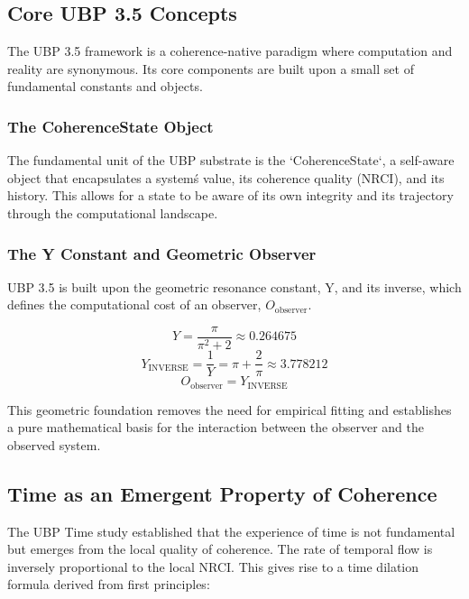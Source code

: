 \documentclass[12pt, a4paper]{article}
\begin{document}
\subsection{Core UBP 3.5 Concepts}
The UBP 3.5 framework is a coherence-native paradigm where computation and reality are synonymous. Its core components are built upon a small set of fundamental constants and objects.

\subsubsection{The CoherenceState Object}
The fundamental unit of the UBP substrate is the `CoherenceState`, a self-aware object that encapsulates a system\'s value, its coherence quality (NRCI), and its history. This allows for a state to be aware of its own integrity and its trajectory through the computational landscape.

\subsubsection{The Y Constant and Geometric Observer}
UBP 3.5 is built upon the geometric resonance constant, Y, and its inverse, which defines the computational cost of an observer, $O_{\text{observer}}$.

\begin{equation}
    Y = \frac{\pi}{\pi^2 + 2} \approx 0.264675
\end{equation}
\begin{equation}
    Y_{\text{INVERSE}} = \frac{1}{Y} = \pi + \frac{2}{\pi} \approx 3.778212
\end{equation}
\begin{equation}
    O_{\text{observer}} = Y_{\text{INVERSE}}
\end{equation}

This geometric foundation removes the need for empirical fitting and establishes a pure mathematical basis for the interaction between the observer and the observed system.

\subsection{Time as an Emergent Property of Coherence}
The UBP Time study \cite{time_study} established that the experience of time is not fundamental but emerges from the local quality of coherence. The rate of temporal flow is inversely proportional to the local NRCI. This gives rise to a time dilation formula derived from first principles:
\end{document}
